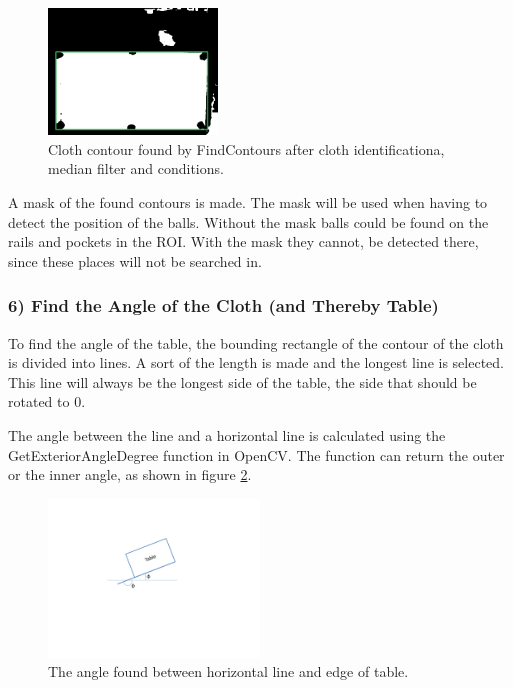 \begin{figure}[H]
\begin{center}
\leavevmode
\includegraphics[width=0.4\textwidth]{images/clothcontour}
\end{center}
\caption{Cloth contour found by FindContours after cloth identificationa, median filter and conditions.}
\label{fig:clothcontour}
\end{figure}

A mask of the found contours is made. The mask will be used when having to detect the position of the balls. Without the mask balls could be found on the rails and pockets in the ROI. With the mask they cannot, be detected there, since these places will not be searched in.


\subsubsection{6) Find the Angle of the Cloth (and Thereby Table)}
To find the angle of the table, the bounding rectangle of the contour of the cloth is divided into lines. A sort of the length is made and the longest line is selected. This line will always be the longest side of the table, the side that should be rotated to 0\degree.

The angle between the line and a horizontal line is calculated using the GetExteriorAngleDegree function in OpenCV. The function can return the outer or the inner angle, as shown in figure \ref{fig:table_angle}.
\begin{figure}[htpb]
\begin{center}
\leavevmode
\includegraphics[width=0.5\textwidth]{images/table_angle}
\end{center}
\caption{The angle found between horizontal line and edge of table.}
\label{fig:table_angle}
\end{figure}

